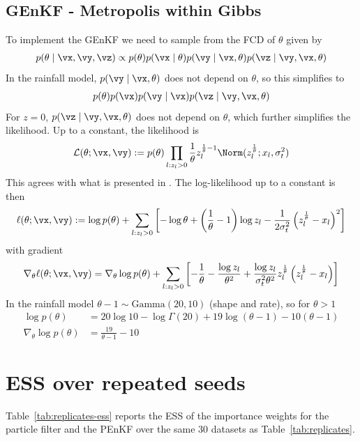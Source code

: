 \documentclass[12pt]{article}
\begin{document}
\subsection{GEnKF - Metropolis within Gibbs}\label{sec:genkf_mcmc}
To implement the GEnKF we need to sample from the FCD of $\theta$ given by
\begin{align}
    p(\theta \mid \vx, \vy, \vz) \propto 
        p(\theta)p(\vx \mid \theta)p(\vy \mid \vx, \theta)p(\vz \mid \vy, \vx, \theta)
\end{align}
In the rainfall model, $p(\vy \mid \vx,\theta)$ does not depend on $\theta$, so this
simplifies to
\begin{align}
    p(\theta)p(\vx)p(\vy \mid \vx)p(\vz \mid \vy, \vx, \theta)
\end{align}
For $z=0$, $p(\vz \mid \vy, \vx, \theta)$ does not depend on $\theta$, which
further simplifies the likelihood. Up to a constant, the likelihood is
\begin{align}
    \mathcal L(\theta;\vx,\vy) := 
        p(\theta)\prod_{l:z_l > 0} \frac{1}{\theta}z_l^{\frac 1 \theta - 1}\Norm(z_l^{\frac 1 \theta};x_l,\sigma_t^2)
\end{align}
This agrees with what is presented in \cite{katzfuss2020}. The log-likelihood
up to a constant is then
\begin{align}
    \ell(\theta;\vx,\vy) := 
        \log p(\theta) + 
        \sum_{l:z_l > 0}\left[-\log \theta +\left(\frac 1 \theta - 1\right)\log z_l -\frac 1 {2\sigma_t^2}\left(z_l^{\frac 1 \theta}-x_l\right)^2\right]
\end{align}
with gradient
\begin{align}
    \nabla_\theta \ell(\theta;\vx,\vy) =
        \nabla_\theta \log p(\theta) +
        \sum_{l:z_l > 0}\left[-\frac 1 \theta - \frac{\log z_l}{\theta^2}
            + \frac{\log z_l}{\sigma_t^2\theta^2}z_l^{\frac 1 \theta}\left(z_l^{\frac 1 \theta}-x_l\right)\right]
\end{align}
In the rainfall model $\theta - 1 \sim \text{Gamma}(20, 10)$ (shape and rate),
so for $\theta > 1$
\begin{align}
    \log p(\theta) &= 20\log 10 - \log\Gamma(20) + 19\log(\theta - 1) - 10(\theta - 1) \\
    \nabla_\theta \log p(\theta) &= \frac{19}{\theta - 1} - 10
\end{align}

\section{ESS over repeated seeds}\label{sec:ess_replicates}
Table~\ref{tab:replicates-ess} reports the ESS of the importance
weights for the particle filter and the PEnKF over the same $30$ datasets as
Table~\ref{tab:replicates}.
\end{document}
